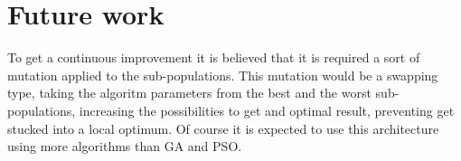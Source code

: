 \documentclass[runningheads]{llncs}
\begin{document}
\section{Future work}

To get a continuous improvement it is believed that it is required a sort of mutation applied to the 
sub-populations. This mutation would be a swapping type, taking the algoritm parameters from the best and the worst 
sub-populations, increasing the possibilities to get and optimal result, preventing get stucked into a local optimum.
Of course it is expected to use this architecture using more algorithms than GA and PSO.



      
  
\end{document}
